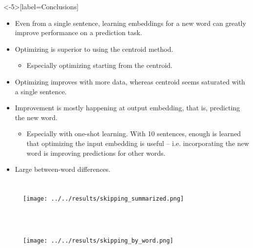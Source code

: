 \documentclass{beamer}
\begin{document}
\begin{frame}<-5>[label=Conclusions]
\begin{itemize}
    \item<1-5, 6-> Even from a single sentence, learning embeddings for a new word can greatly improve performance on a prediction task.
    \item<2-5, 7-> Optimizing is superior to using the centroid method.
    \begin{itemize}
	\item<3-5, 8-> Especially optimizing starting from the centroid.
    \end{itemize}
    \item<4-5, 9-> Optimizing improves with more data, whereas centroid seems saturated with a single sentence.
    \item<10-> Improvement is mostly happening at output embedding, that is, predicting the new word.
    \begin{itemize}
	\item<11-> Especially with one-shot learning. With 10 sentences, enough is learned that optimizing the input embedding is useful -- i.e. incorporating the new word is improving predictions for other words. 
    \end{itemize}
    \item<12-> Large between-word differences. 
\end{itemize}
\end{frame}


\begin{frame}
  \begin{columns}
    \column{\dimexpr\paperwidth}
    \begin{figure}
    \texttt{[image: ../../results/skipping\_summarized.png]}
    \end{figure}
  \end{columns}
\begin{figure}
\end{figure}

\end{frame}
\begin{frame}
  \begin{columns}
    \column{\dimexpr\paperwidth}
    \begin{figure}
    \texttt{[image: ../../results/skipping\_by\_word.png]}
    \end{figure}
  \end{columns}
\begin{figure}
\end{figure}
\end{frame}
\end{document}
